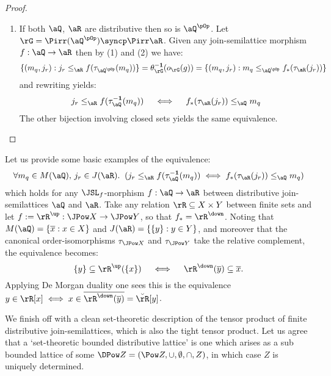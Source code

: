 \documentclass{article}
\begin{document}
\begin{proof}
\begin{enumerate}
\item
If both $\aQ$, $\aR$ are distributive then so is $\aQ^{\pOp}$. Let $\rG = \Pirr(\aQ^{\pOp}) \syncp \Pirr\aR$. Given any join-semilattice morphism $f : \aQ \to \aR$ then by (1) and (2) we have:
\[
\{(m_q,j_r) : j_r \leq_\aR f(\tau_{\aQ^{\pOp}}(m_q)) \}
= \theta_\rG^{\bf-1}(o_\rG(g))
= \{(m_q,j_r) : m_q \leq_{\aQ^{\pOp}} f_*(\tau_\aR (j_r)) \}
\]
and rewriting yields:
\[
j_r \leq_\aR f(\tau_{\aQ}^{\bf-1}(m_q))
\quad\iff\quad
f_*(\tau_\aR (j_r)) \leq_\aQ m_q
\]
The other bijection involving closed sets yields the same equivalence.

\end{enumerate}
\end{proof}

\begin{note}
Let us provide some basic examples of the equivalence:
\[
\forall m_q \in M(\aQ),\, j_r \in J(\aR). \;\;( j_r \leq_\aR f(\tau_\aQ^{\bf-1}(m_q)) \iff f_*(\tau_\aR(j_r)) \leq_\aQ m_q)
\]
which holds for any $\JSL_f$-morphism $f : \aQ \to \aR$ between distributive join-semilattices $\aQ$ and $\aR$. Take any relation $\rR \subseteq X \times Y$ between finite sets and let $f := \rR^\up : \JPow X \to \JPow Y$, so that $f_* = \rR^\down$. Noting that $M(\aQ) = \{ \overline{x} : x \in X \}$ and $J(\aR) = \{ \{y\} : y \in Y\}$, and moreover that the canonical order-isomorphisms $\tau_{\JPow X}$ and $\tau_{\JPow Y}$ take the relative complement, the equivalence becomes:
\[
\{y\} \subseteq \rR^\up(\{x\})
\quad\iff\quad
\rR^\down(\overline{y}) \subseteq \overline{x}.
\]
Applying De Morgan duality one sees this is the equivalence $y \in \rR[x] \iff x \in \overline{\rR^\down(\overline{y})} = \breve{\rR}[y]$. \endbox
\end{note}


\bigskip


We finish off with a clean set-theoretic description of the tensor product of finite distributive join-semilattices, which is also the tight tensor product. Let us agree that a `set-theoretic bounded distributive lattice' is one which arises as a sub bounded lattice of some $\DPow Z = (\Pow Z,\cup,\emptyset,\cap,Z)$, in which case $Z$ is uniquely determined.

\bigskip
\end{document}
